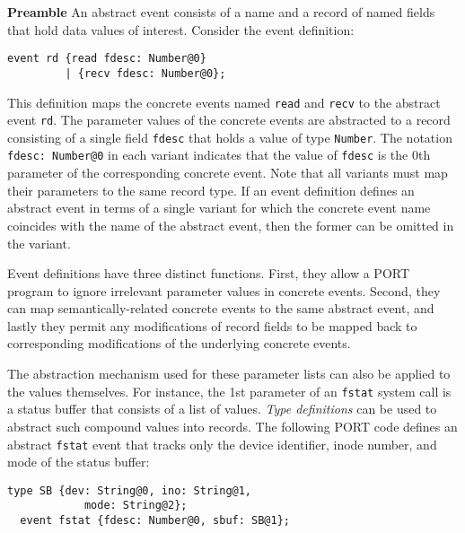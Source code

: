 \noindent\textbf{Preamble} An abstract event consists of a name and a record of named fields that hold data values of interest. Consider the event definition:
\begin{lstlisting}[numbers=none,xleftmargin=0em,gobble=2]
  event rd {read fdesc: Number@0}
         | {recv fdesc: Number@0};
\end{lstlisting}
This definition maps the concrete events named \lstinline+read+ and \lstinline+recv+ to the abstract event \lstinline+rd+. The parameter values of the concrete events are abstracted to a record consisting of a single field \lstinline+fdesc+ that holds a value of type \lstinline+Number+. The notation \lstinline+fdesc: Number@0+ in each variant indicates that the value of \lstinline+fdesc+ is the 0th parameter of the corresponding concrete event. Note that all variants must map their parameters to the same record type.
If an event definition defines an abstract event in terms of a single variant for which the concrete event name coincides with the name of the abstract event, then the former can be omitted in the variant.

Event definitions have three distinct functions. First, they allow a PORT program to ignore
irrelevant parameter values in concrete events. Second, they can map semantically-related concrete events to the same abstract event, and lastly they permit any modifications of record fields to be mapped back to corresponding modifications of the underlying concrete events.

The abstraction mechanism used for these parameter lists can also be applied to the values themselves. For instance, the 1st parameter of an \lstinline+fstat+ system call is a status buffer that consists of a list of values. \emph{Type definitions} can be used to abstract such compound values into records. The following PORT code defines an abstract \lstinline+fstat+ event that tracks only the device identifier, inode number, and mode of the status buffer:
\begin{lstlisting}[numbers=none,xleftmargin=0em,gobble=2]
  type SB {dev: String@0, ino: String@1,
            mode: String@2};
  event fstat {fdesc: Number@0, sbuf: SB@1};
\end{lstlisting}

